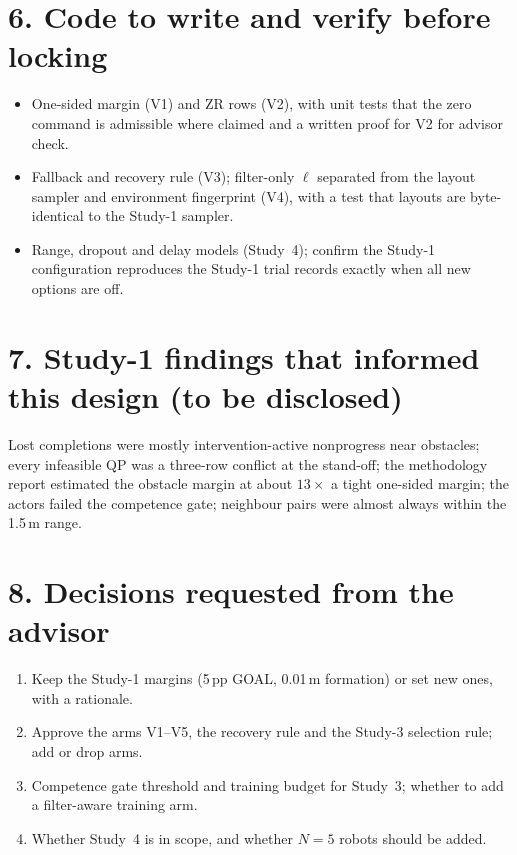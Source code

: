 \documentclass[10pt]{article}
\begin{document}
\section*{6. Code to write and verify before locking}
\begin{itemize}
\item One-sided margin (V1) and ZR rows (V2), with unit tests that the zero command is admissible where claimed and a written proof for V2 for advisor check.
\item Fallback and recovery rule (V3); filter-only $\ell$ separated from the layout sampler and environment fingerprint (V4), with a test that layouts are byte-identical to the Study-1 sampler.
\item Range, dropout and delay models (Study~4); confirm the Study-1 configuration reproduces the Study-1 trial records exactly when all new options are off.
\end{itemize}

\section*{7. Study-1 findings that informed this design (to be disclosed)}
Lost completions were mostly intervention-active nonprogress near obstacles; every infeasible QP was a three-row conflict at the stand-off; the methodology report estimated the obstacle margin at about $13\times$ a tight one-sided margin; the actors failed the competence gate; neighbour pairs were almost always within the 1.5\,m range.

\section*{8. Decisions requested from the advisor}
\begin{enumerate}
\item Keep the Study-1 margins (5\,pp GOAL, 0.01\,m formation) or set new ones, with a rationale.
\item Approve the arms V1--V5, the recovery rule and the Study-3 selection rule; add or drop arms.
\item Competence gate threshold and training budget for Study~3; whether to add a filter-aware training arm.
\item Whether Study~4 is in scope, and whether $N=5$ robots should be added.
\end{enumerate}
\end{document}
